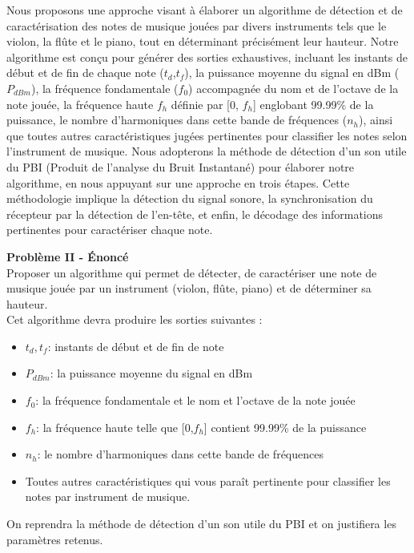 Nous proposons une approche visant à élaborer un algorithme de détection et de caractérisation des notes de musique jouées par divers instruments tels que le violon, la flûte et le piano, tout en déterminant précisément leur hauteur. Notre algorithme est conçu pour générer des sorties exhaustives, incluant les instants de début et de fin de chaque note ($t_d$,$t_f$), la puissance moyenne du signal en dBm ($P_{dBm}$), la fréquence fondamentale ($f_0$) accompagnée du nom et de l’octave de la note jouée, la fréquence haute $f_h$ définie par [0, $f_h$] englobant 99.99\% de la puissance, le nombre d’harmoniques dans cette bande de fréquences ($n_h$), ainsi que toutes autres caractéristiques jugées pertinentes pour classifier les notes selon l'instrument de musique. Nous adopterons la méthode de détection d’un son utile du PBI (Produit de l'analyse du Bruit Instantané) pour élaborer notre algorithme, en nous appuyant sur une approche en trois étapes. Cette méthodologie implique la détection du signal sonore, la synchronisation du récepteur par la détection de l'en-tête, et enfin, le décodage des informations pertinentes pour caractériser chaque note. 

\textbf{Problème II - Énoncé } \  \\
Proposer un algorithme qui permet de détecter, de caractériser une note de musique jouée par un instrument (violon, flûte, piano) et de déterminer sa hauteur. \\
Cet algorithme devra produire les sorties suivantes : \\
\begin{itemize}
    \item $t_d, t_f$: instants de début et de fin de note
    \item $P_{dBm}$: la puissance moyenne du signal en dBm
    \item $f_0$: la fréquence fondamentale et le nom et l'octave de la note jouée
    \item $f_h$: la fréquence haute telle que [0,$f_h$] contient 99.99\% de la puissance
    \item $n_h$: le nombre d'harmoniques dans cette bande de fréquences
    \item Toutes autres caractéristiques qui vous paraît pertinente pour classifier les notes par instrument de musique.
\end{itemize}
 On reprendra la méthode de détection d'un son utile du PBI et on justifiera les paramètres retenus.
